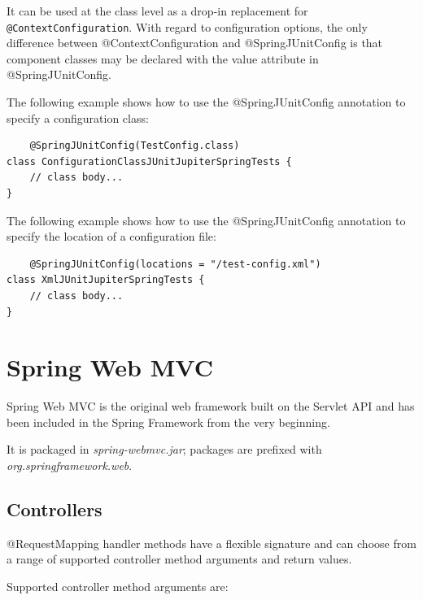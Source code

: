 \documentclass{scrartcl}
\begin{document}
It can be used at the class level as a drop-in replacement for \lstinline|@ContextConfiguration|. With regard to configuration options, the only difference between @ContextConfiguration and @SpringJUnitConfig is that component classes may be declared with the value attribute in @SpringJUnitConfig.

The following example shows how to use the @SpringJUnitConfig annotation to specify a configuration class:

\begin{lstlisting}
    @SpringJUnitConfig(TestConfig.class)
class ConfigurationClassJUnitJupiterSpringTests {
    // class body...
}

\end{lstlisting}

The following example shows how to use the @SpringJUnitConfig annotation to specify the location of a configuration file:

\begin{lstlisting}
    @SpringJUnitConfig(locations = "/test-config.xml")
class XmlJUnitJupiterSpringTests {
    // class body...
}
\end{lstlisting}

\section{Spring Web MVC}

Spring Web MVC is the original web framework built on the Servlet API and has been included in the Spring Framework from the very beginning.

It is packaged in \textit{spring-webmvc.jar}; packages are prefixed with \textit{org.springframework.web}.

\subsection{Controllers}

    @RequestMapping handler methods have a flexible signatu\texttt{}re and can choose from a range of supported controller method arguments and return values.

    Supported controller method arguments are:
\end{document}
